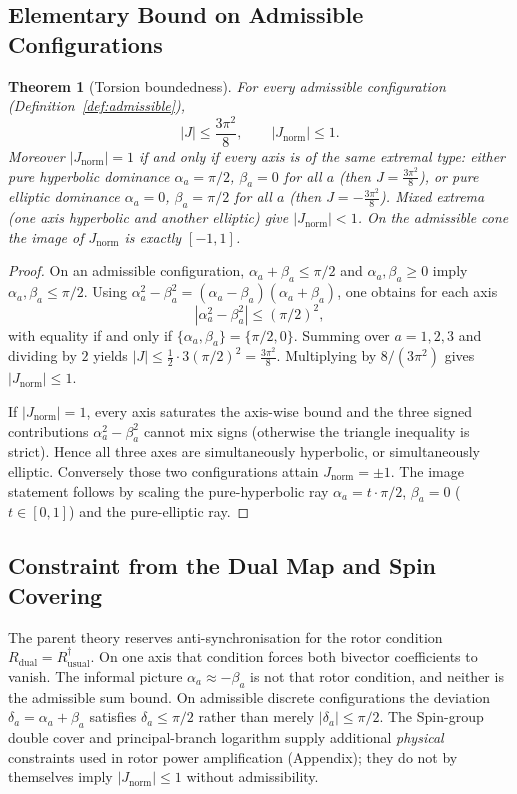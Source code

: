 \documentclass[a4paper]{article}
\newtheorem{theorem}{Theorem}[section]
\theoremstyle{definition}
\theoremstyle{remark}
\newcommand{\Jnorm}{J_{\mathrm{norm}}}
\newcommand{\Jbound}{\frac{3\pi^2}{8}}
\begin{document}
\subsection{Elementary Bound on Admissible Configurations}

\begin{theorem}[Torsion boundedness]
\label{thm:torsion-bound}
For every admissible configuration (Definition~\ref{def:admissible}),
\[
|J| \leq \Jbound, \qquad |\Jnorm| \leq 1.
\]
Moreover \(|\Jnorm| = 1\) if and only if every axis is of the same extremal type: either pure hyperbolic dominance \(\alpha_a = \pi/2\), \(\beta_a = 0\) for all \(a\) (then \(J = \Jbound\)), or pure elliptic dominance \(\alpha_a = 0\), \(\beta_a = \pi/2\) for all \(a\) (then \(J = -\Jbound\)). Mixed extrema (one axis hyperbolic and another elliptic) give \(|\Jnorm| < 1\). On the admissible cone the image of \(\Jnorm\) is exactly \([-1,1]\).
\end{theorem}

\begin{proof}
On an admissible configuration, \(\alpha_a + \beta_a \leq \pi/2\) and \(\alpha_a,\beta_a \geq 0\) imply \(\alpha_a,\beta_a \leq \pi/2\). Using \(\alpha_a^2 - \beta_a^2 = (\alpha_a - \beta_a)(\alpha_a + \beta_a)\), one obtains for each axis
\[
|\alpha_a^2 - \beta_a^2| \leq (\pi/2)^2,
\]
with equality if and only if \(\{\alpha_a,\beta_a\}=\{\pi/2,0\}\). Summing over \(a = 1,2,3\) and dividing by \(2\) yields \(|J| \leq \frac12 \cdot 3(\pi/2)^2 = \Jbound\). Multiplying by \(8/(3\pi^2)\) gives \(|\Jnorm| \leq 1\).

If \(|\Jnorm|=1\), every axis saturates the axis-wise bound and the three signed contributions \(\alpha_a^2-\beta_a^2\) cannot mix signs (otherwise the triangle inequality is strict). Hence all three axes are simultaneously hyperbolic, or simultaneously elliptic. Conversely those two configurations attain \(\Jnorm=\pm 1\). The image statement follows by scaling the pure-hyperbolic ray \(\alpha_a=t\cdot\pi/2\), \(\beta_a=0\) (\(t\in[0,1]\)) and the pure-elliptic ray.
\end{proof}

\subsection{Constraint from the Dual Map and Spin Covering}

The parent theory reserves anti-synchronisation for the rotor condition \(R_{\mathrm{dual}}=R_{\mathrm{usual}}^\dagger\). On one axis that condition forces both bivector coefficients to vanish. The informal picture \(\alpha_a \approx -\beta_a\) is not that rotor condition, and neither is the admissible sum bound. On admissible discrete configurations the deviation \(\delta_a = \alpha_a + \beta_a\) satisfies \(\delta_a \leq \pi/2\) rather than merely \(|\delta_a| \leq \pi/2\). The Spin-group double cover and principal-branch logarithm supply additional \emph{physical} constraints used in rotor power amplification (Appendix); they do not by themselves imply \(|\Jnorm| \leq 1\) without admissibility.
\end{document}
